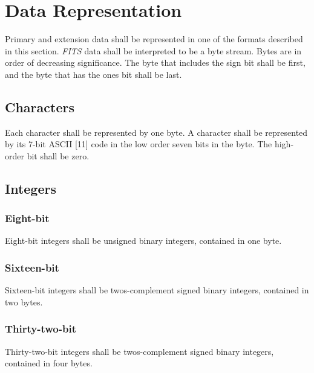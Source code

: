   \chapter{Data Representation}
   \label{s:Drep}
  Primary and extension data shall be 
  represented in one of the formats
  described in this section.  {\em FITS\/} data shall be interpreted to 
  be a byte stream.  Bytes are in order
  of decreasing significance. 
  The byte that includes the sign bit
  shall be first, and the byte 
  that has the ones bit shall be last.   
  
  \section{Characters}
   Each character shall be represented by 
   one byte.  A character
   shall be represented by its 7-bit ASCII [11] code in the low order 
   seven bits in the byte.  The high-order bit shall be zero.
  
  \section{Integers}
  
   \subsection{Eight-bit}
   Eight-bit integers shall be unsigned binary integers, contained 
   in one byte.
  
   \subsection{Sixteen-bit}
   Sixteen-bit integers shall be twos-complement
   signed binary
   integers, contained in two bytes.
  
   \subsection{Thirty-two-bit}
   Thirty-two-bit integers shall be twos-complement
   signed
   binary integers, contained in four
   bytes. 

